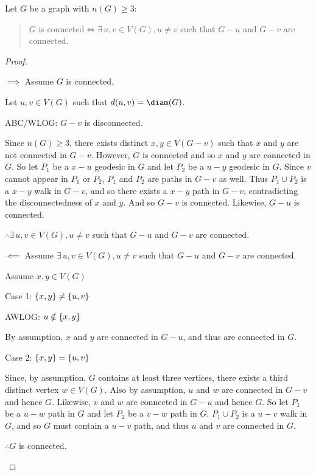 \documentclass[letterpaper,12pt]{article}
\begin{document}
\begin{theorem}
  Let \(G\) be a graph with \(n(G)\ge3\):
  \begin{quote}
    \(G\) is connected\(\iff\exists\,u,v\in V(G),u\ne v\) such that \(G-u\) and \(G-v\) are connected.
  \end{quote}
\end{theorem}

\begin{proof}
  \begin{description}
  \item[]
  \item{\(\implies\)} Assume \(G\) is connected.

    Let \(u,v\in V(G)\) such that \(d(u,v)=\diam(G)\).

    ABC/WLOG: \(G-v\) is disconnected.

    Since \(n(G)\ge3\), there exists distinct \(x,y\in V(G-v)\) such that \(x\) and \(y\) are not connected in
    \(G-v\).  However, \(G\) is connected and so \(x\) and \(y\) are connected in \(G\).  So let \(P_1\) be a
    \(x-u\) geodesic in \(G\) and let \(P_2\) be a \(u-y\) geodesic in \(G\).  Since \(v\) cannot appear in \(P_1\)
    or \(P_2\), \(P_1\) and \(P_2\) are paths in \(G-v\) as well.  Thus \(P_1\cup P_2\) is a \(x-y\) walk in
    \(G-v\), and so there exists a \(x-y\) path in \(G-v\), contradicting the disconnectedness of \(x\) and \(y\).
    And so \(G-v\) is connected.  Likewise, \(G-u\) is connected.

    \(\therefore \exists\,u,v\in V(G),u\ne v\) such that \(G-u\) and \(G-v\) are connected.

  \item{\(\impliedby\)} Assume \(\exists\,u,v\in V(G),u\ne v\) such that \(G-u\) and \(G-v\) are connected.

    Assume \(x,y\in V(G)\)

    \begin{description}
    \item{Case 1:} \(\{x,y\}\ne\{u,v\}\)

      AWLOG: \(u\notin\{x,y\}\)

      By assumption, \(x\) and \(y\) are connected in \(G-u\), and thus are connected in \(G\).

    \item{Case 2:} \(\{x,y\}=\{u,v\}\)

      Since, by assumption, \(G\) contains at least three vertices, there exists a third distinct vertex \(w\in
      V(G)\).  Also by assumption, \(u\) and \(w\) are connected in \(G-v\) and hence \(G\).  Likewise, \(v\) and
      \(w\) are connected in \(G-u\) and hence \(G\). So let \(P_1\) be a \(u-w\) path in \(G\) and let \(P_2\) be
      a \(v-w\) path in \(G\).  \(P_1\cup P_2\) is a \(u-v\) walk in \(G\), and so \(G\) must contain a \(u-v\)
      path, and thus \(u\) and \(v\) are connected in \(G\).
    \end{description}

    \(\therefore G\) is connected.

  \end{description}
\end{proof}
\end{document}
